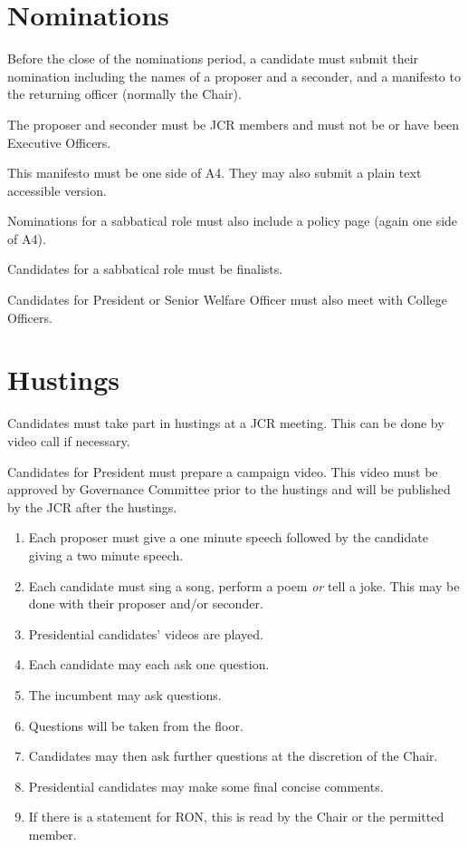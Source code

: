 \documentclass[12pt]{article}
\begin{document}
    \section{Nominations}
    Before the close of the nominations period, a candidate must submit their nomination including the names of a proposer and a seconder, and a manifesto to the returning officer (normally the Chair).

    The proposer and seconder must be JCR members and must not be or have been Executive Officers.

    This manifesto must be one side of A4. They may also submit a plain text accessible version.

    Nominations for a sabbatical role must also include a policy page (again one side of A4).

    Candidates for a sabbatical role must be finalists.

    Candidates for President or Senior Welfare Officer must also meet with College Officers.

    \section{Hustings}
    Candidates must take part in hustings at a JCR meeting. This can be done by video call if necessary.

    Candidates for President must prepare a campaign video. This video must be approved by Governance Committee prior to the hustings and will be published by the JCR after the hustings.

    \begin{enumerate}
        \item Each proposer must give a one minute speech followed by the candidate giving a two minute speech.
        \item Each candidate must sing a song, perform a poem \emph{or} tell a joke. This may be done with their proposer and/or seconder.
        \item Presidential candidates' videos are played.
        \item Each candidate may each ask one question.
        \item The incumbent may ask questions.
        \item Questions will be taken from the floor.
        \item Candidates may then ask further questions at the discretion of the Chair.
        \item Presidential candidates may make some final concise comments.
        \item If there is a statement for RON, this is read by the Chair or the permitted member.
    \end{enumerate}
\end{document}
